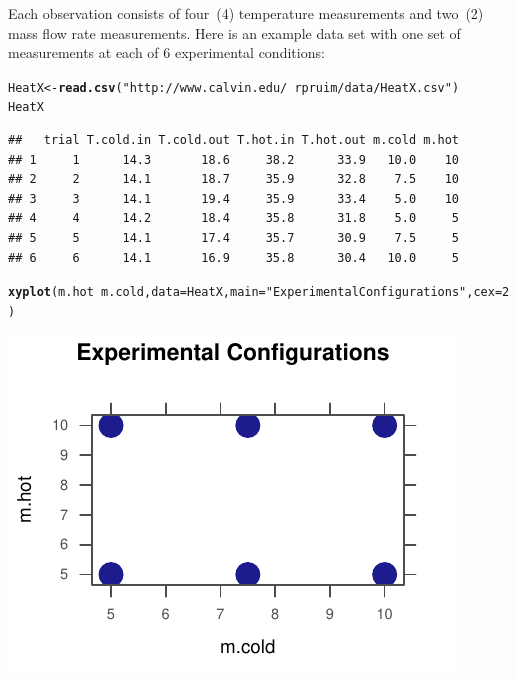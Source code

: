 \documentclass[twoside]{book}\usepackage[]{graphicx}\usepackage[]{xcolor}
\makeatletter
\def\maxwidth{ %
  \ifdim\Gin@nat@width>\linewidth
    \linewidth
  \else
    \Gin@nat@width
  \fi
}
\newcommand{\hlnum}[1]{\textcolor[rgb]{0.686,0.059,0.569}{#1}}%
\newcommand{\hlstr}[1]{\textcolor[rgb]{0.192,0.494,0.8}{#1}}%
\newcommand{\hlopt}[1]{\textcolor[rgb]{0,0,0}{#1}}%
\newcommand{\hlstd}[1]{\textcolor[rgb]{0.345,0.345,0.345}{#1}}%
\newcommand{\hlkwb}[1]{\textcolor[rgb]{0.69,0.353,0.396}{#1}}%
\newcommand{\hlkwc}[1]{\textcolor[rgb]{0.333,0.667,0.333}{#1}}%
\newcommand{\hlkwd}[1]{\textcolor[rgb]{0.737,0.353,0.396}{\textbf{#1}}}%
\newenvironment{kframe}{%
 \def\at@end@of@kframe{}%
 \ifinner\ifhmode%
  \def\at@end@of@kframe{\end{minipage}}%
  \begin{minipage}{\columnwidth}%
 \fi\fi%
 \def\FrameCommand##1{\hskip\@totalleftmargin \hskip-\fboxsep
 \colorbox{shadecolor}{##1}\hskip-\fboxsep
     \hskip-\linewidth \hskip-\@totalleftmargin \hskip\columnwidth}%
 \MakeFramed {\advance\hsize-\width
   \@totalleftmargin\z@ \linewidth\hsize
   \@setminipage}}%
 {\par\unskip\endMakeFramed%
 \at@end@of@kframe}
\newenvironment{knitrout}{}{} %
\newcounter{example}[section]
\makeatother
\begin{document}

Each observation consists of four~(4) temperature measurements 
and two~(2) mass flow rate measurements. 
Here is an example data set with one set of measurements at each of 6
experimental conditions:

\begin{knitrout}
\color{fgcolor}\begin{kframe}
\begin{alltt}
\hlstd{HeatX} \hlkwb{<-} \hlkwd{read.csv}\hlstd{(}\hlstr{"http://www.calvin.edu/~rpruim/data/HeatX.csv"}\hlstd{)}
\hlstd{HeatX}
\end{alltt}
\begin{verbatim}
##   trial T.cold.in T.cold.out T.hot.in T.hot.out m.cold m.hot
## 1     1      14.3       18.6     38.2      33.9   10.0    10
## 2     2      14.1       18.7     35.9      32.8    7.5    10
## 3     3      14.1       19.4     35.9      33.4    5.0    10
## 4     4      14.2       18.4     35.8      31.8    5.0     5
## 5     5      14.1       17.4     35.7      30.9    7.5     5
## 6     6      14.1       16.9     35.8      30.4   10.0     5
\end{verbatim}
\begin{alltt}
\hlkwd{xyplot}\hlstd{(m.hot} \hlopt{~} \hlstd{m.cold,} \hlkwc{data} \hlstd{= HeatX,} \hlkwc{main} \hlstd{=} \hlstr{"Experimental Configurations"}\hlstd{,} \hlkwc{cex} \hlstd{=} \hlnum{2}\hlstd{)}
\end{alltt}
\end{kframe}

{\centering \includegraphics[width=\maxwidth]{figures/fig-unnamed-chunk-295-1} 

}



\end{knitrout}
\end{document}
